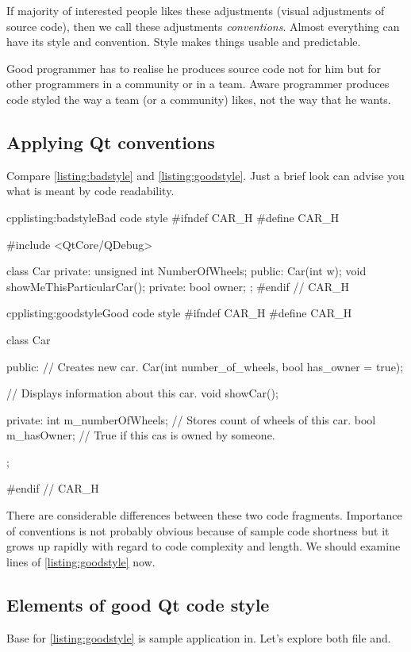 If majority of interested people likes these adjustments (\eg visual adjustments of source code), then we call these adjustments \emph{conventions}. Almost everything can have its style and convention. Style makes things usable and predictable.

Good programmer has to realise he produces source code not for him but for other programmers in a community or in a team. Aware programmer produces code styled the way a team (or a community) likes, not the way that he wants.

\subsection{Applying Qt conventions}
Compare \autoref{listing:badstyle} and \autoref{listing:goodstyle}. Just a brief look can advise you what is meant by code readability.
\begin{fdoccode}{cpp}{listing:badstyle}{Bad code style}
#ifndef CAR_H
#define CAR_H

#include <QtCore/QDebug>


class Car {
    private:
		unsigned int NumberOfWheels;
    public:
		Car(int w);
		void showMeThisParticularCar();
    private:
		bool owner;
};
#endif // CAR_H
\end{fdoccode}

\begin{fdoccode}{cpp}{listing:goodstyle}{Good code style}
#ifndef CAR_H
#define CAR_H


class Car {
    public:
		// Creates new car.
		Car(int number_of_wheels, bool has_owner = true);

		// Displays information about this car.
		void showCar();

    private:
		int m_numberOfWheels; // Stores count of wheels of this car.
		bool m_hasOwner; // True if this cas is owned by someone.
};

#endif // CAR_H
\end{fdoccode}

There are considerable differences between these two code fragments. Importance of conventions is not probably obvious because of sample code shortness but it grows up rapidly with regard to code complexity and length. We should examine lines of \autoref{listing:goodstyle} now.

\subsection{Elements of good Qt code style}
Base for \autoref{listing:goodstyle} is sample application in. Let's explore both file and.

